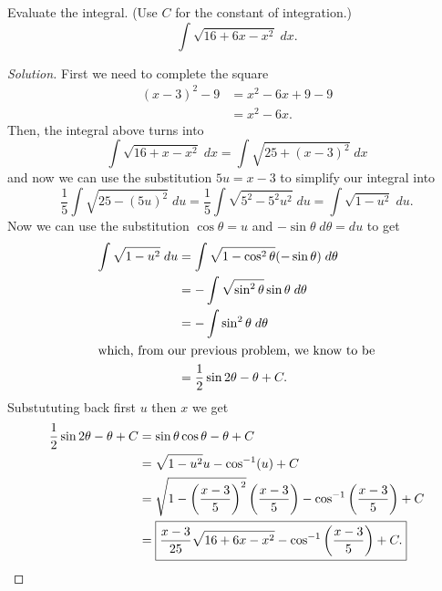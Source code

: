 \begin{problem}[WebAssign, HW 12, \# 3]
Evaluate the integral. (Use $C$ for the constant of integration.)
\[
\int\sqrt{16+6x-x^2}\;dx.
\]
\end{problem}
\begin{proof}[Solution]
First we need to complete the square
\begin{align*}
(x-3)^2-9&=x^2-6x+9-9\\
         &=x^2-6x.
\end{align*}
Then, the integral above turns into
\[
\int\sqrt{16+x-x^2}\;dx=\int\sqrt{25+(x-3)^2}\;dx
\]
and now we can use the substitution $5u=x-3$ to simplify our integral into
\[
\frac{1}{5}\int\sqrt{25-(5u)^2}\;du=
\frac{1}{5}\int\sqrt{5^2-5^2u^2}\;du=
\int\sqrt{1-u^2}\;du.
\]
Now we can use the substitution $\cos\theta=u$ and
$-\sin\theta\;d\theta=du$ to get
\begin{align*}
\int\sqrt{1-u^2}\;du
&=\int\sqrt{1-\cos^2\theta}(-\sin\theta)\;d\theta\\
&=-\int\sqrt{\sin^2\theta}\sin\theta\;d\theta\\
&=-\int\sin^2\theta\;d\theta\\
\intertext{which, from our previous problem, we know to be}
&=\frac{1}{2}\sin 2\theta-\theta+C.
\end{align*}
Substututing back first $u$ then $x$ we get
\begin{align*}
\frac{1}{2}\sin 2\theta-\theta+C
&=\sin\theta\cos\theta-\theta+C\\
&=\sqrt{1-u^2}u-\cos^{-1}(u)+C\\
&=\sqrt{1-\left(\frac{x-3}{5}\right)^2}\left(\frac{x-3}{5}\right)-\cos^{-1}\left(\frac{x-3}{5}\right)+C\\
&=\boxed{\frac{x-3}{25}\sqrt{16+6x-x^2}-\cos^{-1}\left(\frac{x-3}{5}\right)+C.}\qedhere
\end{align*}
\end{proof}


